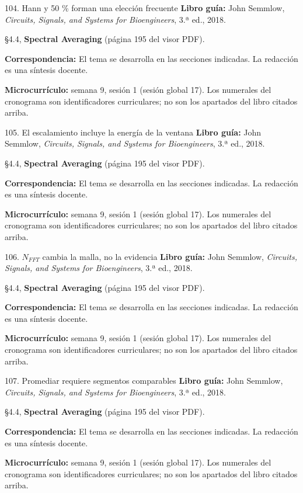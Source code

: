 \documentclass[
  10pt,
  ignorenonframetext,
  aspectratio=169,
  spanish,
]{beamer}
\begin{document}
\begin{frame}{104. Hann y 50 \% forman una elección frecuente}
\label{hann-y-50-forman-una-elecciuxf3n-frecuente}
\textbf{Libro guía:} John Semmlow, \emph{Circuits, Signals, and Systems
for Bioengineers}, 3.ª ed., 2018.

§4.4, \textbf{Spectral Averaging} (página 195 del visor PDF).

\textbf{Correspondencia:} El tema se desarrolla en las secciones
indicadas. La redacción es una síntesis docente.

\textbf{Microcurrículo:} semana 9, sesión 1 (sesión global 17). Los
numerales del cronograma son identificadores curriculares; no son los
apartados del libro citados arriba.
\end{frame}

\begin{frame}{105. El escalamiento incluye la energía de la ventana}
\label{el-escalamiento-incluye-la-energuxeda-de-la-ventana}
\textbf{Libro guía:} John Semmlow, \emph{Circuits, Signals, and Systems
for Bioengineers}, 3.ª ed., 2018.

§4.4, \textbf{Spectral Averaging} (página 195 del visor PDF).

\textbf{Correspondencia:} El tema se desarrolla en las secciones
indicadas. La redacción es una síntesis docente.

\textbf{Microcurrículo:} semana 9, sesión 1 (sesión global 17). Los
numerales del cronograma son identificadores curriculares; no son los
apartados del libro citados arriba.
\end{frame}

\begin{frame}{106. \(N_{FFT}\) cambia la malla, no la evidencia}
\label{n_fft-cambia-la-malla-no-la-evidencia}
\textbf{Libro guía:} John Semmlow, \emph{Circuits, Signals, and Systems
for Bioengineers}, 3.ª ed., 2018.

§4.4, \textbf{Spectral Averaging} (página 195 del visor PDF).

\textbf{Correspondencia:} El tema se desarrolla en las secciones
indicadas. La redacción es una síntesis docente.

\textbf{Microcurrículo:} semana 9, sesión 1 (sesión global 17). Los
numerales del cronograma son identificadores curriculares; no son los
apartados del libro citados arriba.
\end{frame}

\begin{frame}{107. Promediar requiere segmentos comparables}
\label{promediar-requiere-segmentos-comparables}
\textbf{Libro guía:} John Semmlow, \emph{Circuits, Signals, and Systems
for Bioengineers}, 3.ª ed., 2018.

§4.4, \textbf{Spectral Averaging} (página 195 del visor PDF).

\textbf{Correspondencia:} El tema se desarrolla en las secciones
indicadas. La redacción es una síntesis docente.

\textbf{Microcurrículo:} semana 9, sesión 1 (sesión global 17). Los
numerales del cronograma son identificadores curriculares; no son los
apartados del libro citados arriba.
\end{frame}
\end{document}
